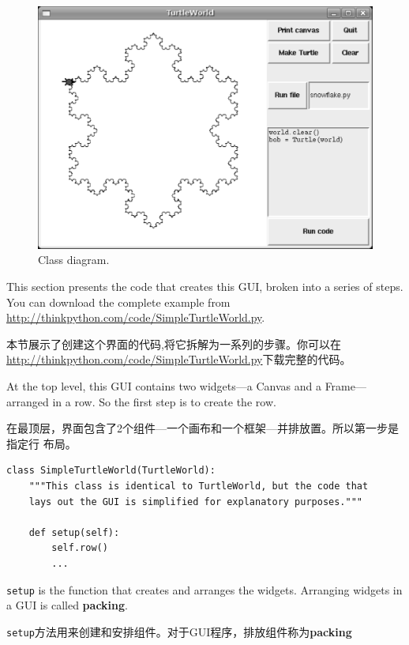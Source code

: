 \documentclass[10pt]{book}
\begin{document}
\begin{CJK}{UTF8}{gbsn}
\begin{figure}
\centerline{\includegraphics[scale=0.5]{figs/TurtleWorld.pdf}}
\caption{Class diagram.}
\label{fig.turtleworld}
\end{figure}


This section presents the code that creates this GUI, broken into a
series of steps.  You can download the complete example
from \url{http://thinkpython.com/code/SimpleTurtleWorld.py}.

本节展示了创建这个界面的代码,将它拆解为一系列的步骤。你可以在
\url{http://thinkpython.com/code/SimpleTurtleWorld.py}下载完整的代码。

At the top level, this GUI contains two widgets---a Canvas and a
Frame---arranged in a row.  So the first step is to create the row.

在最顶层，界面包含了2个组件---一个画布和一个框架---并排放置。所以第一步是指定行
布局。

\begin{verbatim}
class SimpleTurtleWorld(TurtleWorld):
    """This class is identical to TurtleWorld, but the code that
    lays out the GUI is simplified for explanatory purposes."""

    def setup(self):
        self.row()
        ...
\end{verbatim}
%
{\tt setup} is the function that creates and arranges the widgets.
Arranging widgets in a GUI is called {\bf packing}.

{\tt setup}方法用来创建和安排组件。对于GUI程序，排放组件称为{\bf packing}


\end{CJK}
\end{document}
